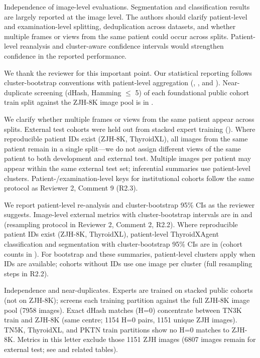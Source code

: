 \begin{reviewercomment}
Independence of image-level evaluations. Segmentation and classification results are largely reported at the image level. The authors should clarify patient-level and examination-level splitting, deduplication across datasets, and whether multiple frames or views from the same patient could occur across splits. Patient-level reanalysis and cluster-aware confidence intervals would strengthen confidence in the reported performance.
\end{reviewercomment}
\begin{authorresponse}
We thank the reviewer for this important point. Our statistical reporting follows cluster-bootstrap conventions with patient-level aggregation (, , and ). Near-duplicate screening (dHash, Hamming $\leq$ 5) of each foundational public cohort train split against the ZJH-8K image pool is in .\par
We clarify whether multiple frames or views from the same patient appear across splits. External test cohorts were held out from stacked expert training (). Where reproducible patient IDs exist (ZJH-8K, ThyroidXL), all images from the same patient remain in a single split---we do not assign different views of the same patient to both development and external test. Multiple images per patient may appear within the same external test set; inferential summaries use patient-level clusters. Patient-/examination-level keys for institutional cohorts follow the same protocol as Reviewer 2, Comment 9 (R2.3).\par
We report patient-level re-analysis and cluster-bootstrap 95\% CIs as the reviewer suggests. Image-level external metrics with cluster-bootstrap intervals are in  and  (resampling protocol in Reviewer 2, Comment 2, R2.2). Where reproducible patient IDs exist (ZJH-8K, ThyroidXL), patient-level ThyroidXAgent classification and segmentation with cluster-bootstrap 95\% CIs are in  (cohort counts in ). For bootstrap and these summaries, patient-level clusters apply when IDs are available; cohorts without IDs use one image per cluster (full resampling steps in R2.2).\par
Independence and near-duplicates. Experts are trained on stacked public cohorts (not on ZJH-8K);  screens each training partition against the full ZJH-8K image pool (7958 images). Exact dHash matches (H=0) concentrate between TN3K train and ZJH-8K (same centre; 1154 H=0 pairs, 1151 unique ZJH images). TN5K, ThyroidXL, and PKTN train partitions show no H=0 matches to ZJH-8K. Metrics in this letter exclude those 1151 ZJH images (6807 images remain for external test; see  and related tables).\par
\par
\end{authorresponse}

